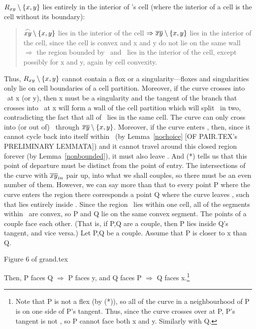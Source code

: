 $\mbox{$R_{xy}$} \setminus \{x,y\}$ lies entirely in the interior of 
's cell (where the interior of a cell 
is the cell without its boundary):
\begin{quote}
	$\mbox{$\stackrel{\frown}{xy}$} \setminus \{x,y\}$ lies in the interior of the cell
	$\Rightarrow \mbox{$\overline{xy}$} \setminus \{x,y\}$ lies in the interior 
	of the cell, since the cell is convex and x and y do not lie on
	the same wall $\Rightarrow$ the region bounded by \ and 
	\ lies in the interior of the cell, except possibly for x
	and y, again by cell convexity.
\end{quote}
Thus, $\mbox{$R_{xy}$} \setminus \{x,y\}$ cannot contain 
\marginpar{(*)}
a flox or a singularity---floxes and singularities only lie on cell
boundaries of a cell partition.
Moreover, if the curve crosses into \Rxy\ at x (or y), then x must be a
singularity and the tangent of the branch that crosses into \Rxy\
at x will form a wall of the cell partition which will split \Rxy\ in
two, contradicting the fact that all of \Rxy\ lies in the same cell.
\hence The curve can only cross into (or out of) \Rxy\ through 
$\mbox{$\overline{xy}$} \setminus \{x,y\}$.
Moreover, if the curve enters \Rxy, then, since 
it cannot cycle back into itself 
within \Rxy\ (by Lemma~\ref{nochoice} [OF PAIR.TEX's PRELIMINARY LEMMATA])
and it cannot travel around this closed region forever
(by Lemma~\ref{nonbounded}), it must also leave \Rxy.
And (*) tells us that this point of departure must be distinct from the point
of entry.
\hence The intersections of the curve with $\mbox{$\overline{xy}$}_{in}$
pair up, into what we shall couples, so there must be an even
number of them.
However, we can say more than that to every point P where
the curve enters the region
there corresponds a point Q where the curve leaves \Rxy,
such that  lies entirely inside \Rxy.
Since the region \Rxy\ lies within one cell, all of the segments within
\Rxy\ are convex, so P and Q lie on the same convex segment.
\hence The points of a couple face each other.
(That is, if P,Q are a couple, then P lies inside Q's tangent, and
vice versa.)
Let P,Q be a couple.
Assume \wlogg that P is closer to x than Q.
\begin{center}
Figure 6 of grand.tex
\end{center}
Then, P faces Q $\Rightarrow$ P faces y, and Q faces P $\Rightarrow$ Q
faces x.\footnote{Note that P is not a flex (by (*)), so
all of the curve in a neighbourhood of P is on one 
side of P's tangent.
Thus, since the curve crosses over  at P, P's tangent
is not , so P cannot face both x and y.  Similarly with Q.}
